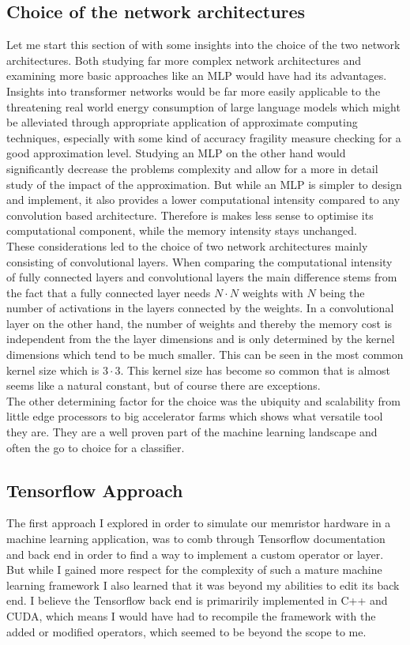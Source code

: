 \documentclass[]{IEEEtran}
\begin{document}
\subsection{Choice of the network architectures}
Let me start this section of with some insights into the choice of the two network architectures. Both studying far more complex network architectures and examining more basic approaches like an MLP would have had its advantages. Insights into transformer networks would be far more easily applicable to the threatening real world energy consumption of large language models which might be alleviated through appropriate application of approximate computing techniques, especially with some kind of accuracy fragility measure checking for a good approximation level. Studying an MLP on the other hand would significantly decrease the problems complexity and allow for a more in detail study of the impact of the approximation. But while an MLP is simpler to design and implement, it also provides a lower computational intensity compared to any convolution based architecture. Therefore is makes less sense to optimise its computational component, while the memory intensity stays unchanged.\\
These considerations led to the choice of two network architectures mainly consisting of convolutional layers. When comparing the computational intensity of fully connected layers and convolutional layers the main difference stems from the fact that a fully connected layer needs $ N \cdot N$ weights with $N$ being the number of activations in the layers connected by the weights. In a convolutional layer on the other hand, the number of weights and thereby the memory cost is independent from the the layer dimensions and is only determined by the kernel dimensions which tend to be much smaller. This can be seen in the most common kernel size which is $ 3 \cdot 3$. This kernel size has become so common that is almost seems like a natural constant, but of course there are exceptions.\\
The other determining factor for the choice was the ubiquity and scalability from little edge processors to big accelerator farms which shows what versatile tool they are. They are a well proven part of the machine learning landscape and often the go to choice for a classifier.

\subsection{Tensorflow Approach}
The first approach I explored in order to simulate our memristor hardware in a machine learning application, was to comb through Tensorflow documentation and back end in order to find a way to implement a custom operator or layer. But while I gained more respect for the complexity of such a mature machine learning framework I also learned that it was beyond my abilities to edit its back end. I believe the Tensorflow back end is primaririly implemented in C++ and CUDA, which means I would have had to recompile the framework with the added or modified operators, which seemed to be beyond the scope to me.
\end{document}
